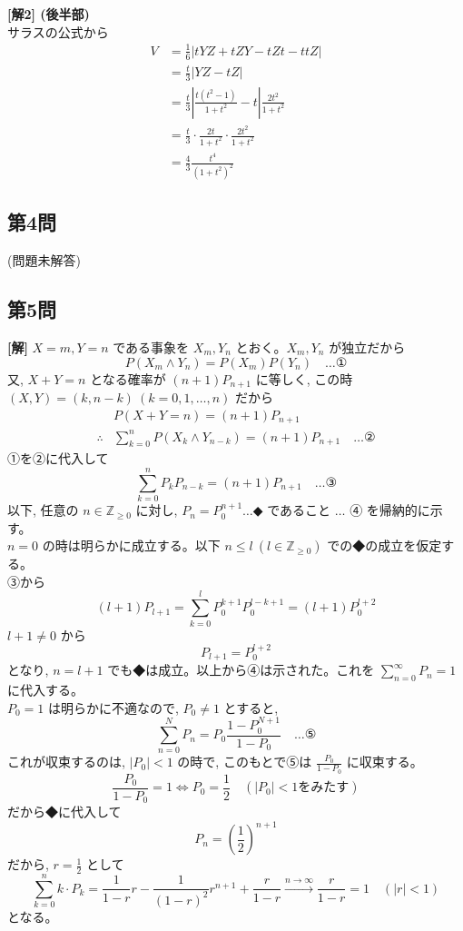 \documentclass[../main.tex]{subfiles}
\begin{document}
\vspace{1em}
\noindent
\textbf{[解2] (後半部)} \\
サラスの公式から
\begin{align*}
  V &= \frac{1}{6} |t Y Z + t Z Y - t Z t - t t Z| \\
  &= \frac{t}{3} |Y Z - t Z| \\
  &= \frac{t}{3} \left| \frac{t(t^2-1)}{1+t^2} - t \right| \frac{2t^2}{1+t^2} \\
  &= \frac{t}{3} \cdot \frac{2t}{1+t^2} \cdot \frac{2t^2}{1+t^2} \\
  &= \frac{4}{3} \frac{t^4}{(1+t^2)^2}
\end{align*}

\newpage

\subsection*{第4問}

\noindent
(問題未解答)

\newpage

\subsection*{第5問}

\noindent
\textbf{[解]} $X=m, Y=n$ である事象を $X_m, Y_n$ とおく。$X_m, Y_n$ が独立だから
\[
  P(X_m \wedge Y_n) = P(X_m) P(Y_n) \quad \dots \text{①}
\]
又, $X+Y=n$ となる確率が $(n+1) P_{n+1}$ に等しく, この時 $(X, Y) = (k, n-k) \ (k=0, 1, \dots, n)$ だから
\begin{align*}
  & P(X+Y=n) = (n+1) P_{n+1} \\
  \therefore & \sum_{k=0}^n P(X_k \wedge Y_{n-k}) = (n+1) P_{n+1} \quad \dots \text{②}
\end{align*}
①を②に代入して
\[
  \sum_{k=0}^n P_k P_{n-k} = (n+1) P_{n+1} \quad \dots \text{③}
\]
以下, 任意の $n \in \mathbb{Z}_{\ge 0}$ に対し, $P_n = P_0^{n+1} \dots \text{◆}$ であること $\dots$ ④ を帰納的に示す。 \\
$n=0$ の時は明らかに成立する。以下 $n \le l \ (l \in \mathbb{Z}_{\ge 0})$ での◆の成立を仮定する。 \\
③から
\[
  (l+1) P_{l+1} = \sum_{k=0}^l P_0^{k+1} P_0^{l-k+1} = (l+1) P_0^{l+2}
\]
$l+1 \neq 0$ から
\[
  P_{l+1} = P_0^{l+2}
\]
となり, $n=l+1$ でも◆は成立。以上から④は示された。これを $\sum_{n=0}^\infty P_n = 1$ に代入する。 \\
$P_0 = 1$ は明らかに不適なので, $P_0 \neq 1$ とすると,
\[
  \sum_{n=0}^N P_n = P_0 \frac{1 - P_0^{N+1}}{1 - P_0} \quad \dots \text{⑤}
\]
これが収束するのは, $|P_0| < 1$ の時で, このもとで⑤は $\frac{P_0}{1-P_0}$ に収束する。
\[
  \frac{P_0}{1-P_0} = 1 \iff P_0 = \frac{1}{2} \quad (|P_0| < 1 \text{をみたす})
\]
だから◆に代入して
\[
  P_n = \left(\frac{1}{2}\right)^{n+1}
\]
だから, $r = \frac{1}{2}$ として
\[
  \sum_{k=0}^n k \cdot P_k = \frac{1}{1-r} r - \frac{1}{(1-r)^2} r^{n+1} + \frac{r}{1-r} \xrightarrow{n \to \infty} \frac{r}{1-r} = 1 \quad (|r| < 1)
\]
となる。
\end{document}
